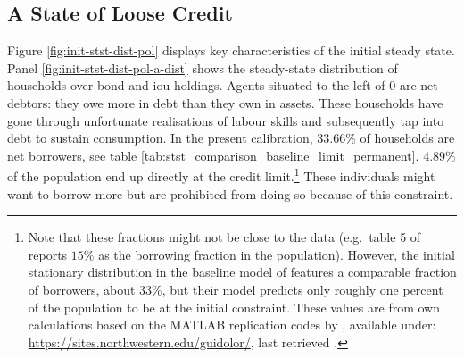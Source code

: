 \documentclass[a4paper,12pt]{article} %
\numberwithin{equation}{section} %
\numberwithin{figure}{section}
\numberwithin{table}{section}
\begin{document}
\subsection{A State of Loose Credit}
\label{sec:limit-stst-loose}

Figure \ref{fig:init-stst-dist-pol} displays key characteristics of the initial steady state. Panel \ref{fig:init-stst-dist-pol-a-dist} shows the steady-state distribution of households over bond and \Gls{iou} holdings. Agents situated to the left of $0$ are net debtors: they owe more in debt than they own in assets. These households have gone through unfortunate realisations of labour skills and subsequently tap into debt to sustain consumption. In the present calibration, $33.66\%$ of households are net borrowers, see table \ref{tab:stst_comparison_baseline_limit_permanent}. $4.89\%$ of the population end up directly at the credit limit.\footnote{Note that these fractions might not be close to the data (e.g.~table 5 of \cite[p.~722]{kaplan2018} reports $15\%$ as the borrowing fraction in the population). However, the initial stationary distribution in the baseline model of \textcite{gl2017} features a comparable fraction of borrowers, about $33\%$, but their model predicts only roughly one percent of the population to be at the initial constraint. These values are from own calculations based on the MATLAB replication codes by \textcite{gl2017}, available under: \url{https://sites.northwestern.edu/guidolor/}, last retrieved .} These individuals might want to borrow more but are prohibited from doing so because of this constraint.
\end{document}
